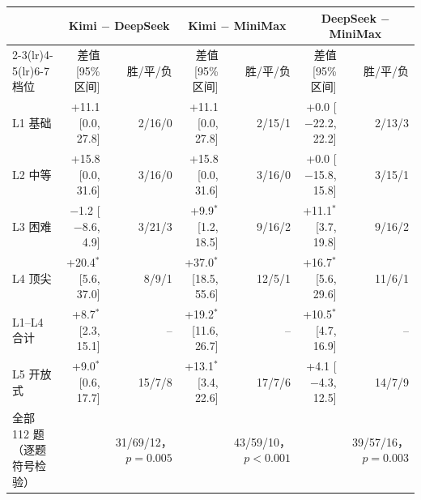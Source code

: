\begin{tabular}{@{}lrrrrrr@{}}
\toprule
 & \multicolumn{2}{c}{Kimi $-$ DeepSeek} & \multicolumn{2}{c}{Kimi $-$ MiniMax} & \multicolumn{2}{c}{DeepSeek $-$ MiniMax} \\
\cmidrule(lr){2-3}\cmidrule(lr){4-5}\cmidrule(lr){6-7}
档位 & 差值 [95\% 区间] & 胜/平/负 & 差值 [95\% 区间] & 胜/平/负 & 差值 [95\% 区间] & 胜/平/负 \\
\midrule
L1 基础 & +11.1 [0.0, 27.8] & 2/16/0 & +11.1 [0.0, 27.8] & 2/15/1 & +0.0 [$-$22.2, 22.2] & 2/13/3 \\
L2 中等 & +15.8 [0.0, 31.6] & 3/16/0 & +15.8 [0.0, 31.6] & 3/16/0 & +0.0 [$-$15.8, 15.8] & 3/15/1 \\
L3 困难 & $-$1.2 [$-$8.6, 4.9] & 3/21/3 & +9.9$^{*}$ [1.2, 18.5] & 9/16/2 & +11.1$^{*}$ [3.7, 19.8] & 9/16/2 \\
L4 顶尖 & +20.4$^{*}$ [5.6, 37.0] & 8/9/1 & +37.0$^{*}$ [18.5, 55.6] & 12/5/1 & +16.7$^{*}$ [5.6, 29.6] & 11/6/1 \\
\midrule
L1--L4 合计 & +8.7$^{*}$ [2.3, 15.1] & -- & +19.2$^{*}$ [11.6, 26.7] & -- & +10.5$^{*}$ [4.7, 16.9] & -- \\
\midrule
L5 开放式 & +9.0$^{*}$ [0.6, 17.7] & 15/7/8 & +13.1$^{*}$ [3.4, 22.6] & 17/7/6 & +4.1 [$-$4.3, 12.5] & 14/7/9 \\
\midrule
全部 112 题（逐题符号检验） &  & 31/69/12，$p=0.005$ &  & 43/59/10，$p<0.001$ &  & 39/57/16，$p=0.003$ \\
\bottomrule
\end{tabular}
